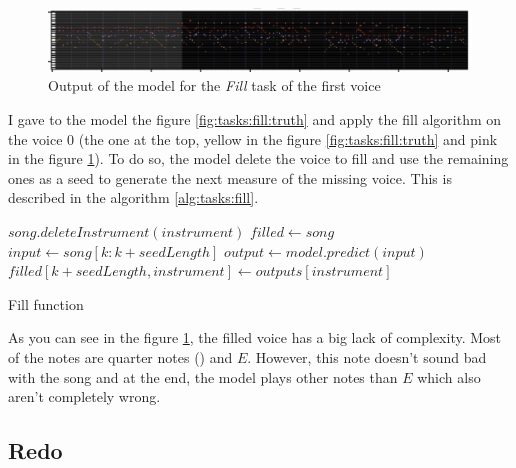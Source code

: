\documentclass[12pt]{report}
\begin{document}
\begin{figure}[htbp]
    \centering
    \includegraphics[width=\textwidth]{images/generated_midis/tasks/fill/task-fill-0.jpg}
    \caption{Output of the model for the \textit{Fill} task of the first voice}
    \label{fig:tasks:fill:0}
\end{figure}

I gave to the model the figure \ref{fig:tasks:fill:truth} and apply the fill algorithm on the voice $0$ (the one at the top, yellow in the figure \ref{fig:tasks:fill:truth} and pink in the figure \ref{fig:tasks:fill:0}).
To do so, the model delete the voice to fill and use the remaining ones as a seed to generate the next measure of the missing voice.
This is described in the algorithm \ref{alg:tasks:fill}.


\begin{algorithm}
    \begin{algorithmic}[1]
        \Statex
            \State $song.deleteInstrument(instrument)$
            \State $filled \gets song$
                \State $input \gets song[k:k + seedLength]$
                \State $output \gets model.predict(input)$
                \State $filled[k + seedLength, instrument] \gets outputs[instrument]$
            \EndFor
            \State {}
        \EndFunction
        \end{algorithmic}
    \caption{Fill function}
    \label{alg:tasks:fill}
\end{algorithm}

As you can see in the figure \ref{fig:tasks:fill:0}, the filled voice has a big lack of complexity.
Most of the notes are quarter notes (\musQuarter) and $E$.
However, this note doesn't sound bad with the song and at the end, the model plays other notes than $E$ which also aren't completely wrong.

\subsection{Redo}
\label{sec:tasks:redo}
\end{document}
